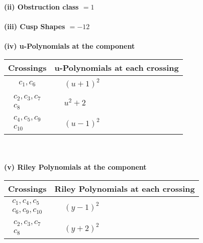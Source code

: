 \documentclass[1p]{elsarticle_modified}
\theoremstyle{definition}
\begin{document}
\flushleft \textbf{(ii) Obstruction class $= 1$}\\~\\
\flushleft \textbf{(iii) Cusp Shapes $= -12$}\\~\\
\newpage\renewcommand{\arraystretch}{1}
\flushleft \textbf{(iv) u-Polynomials at the component}\newline \\
\begin{tabular}{m{50pt}|m{274pt}}
Crossings & \hspace{64pt}u-Polynomials at each crossing \\
\hline $$\begin{aligned}c_{1},c_{6}\end{aligned}$$&$\begin{aligned}
&(u+1)^2
\end{aligned}$\\
\hline $$\begin{aligned}c_{2},c_{3},c_{7}\\c_{8}\end{aligned}$$&$\begin{aligned}
&u^2+2
\end{aligned}$\\
\hline $$\begin{aligned}c_{4},c_{5},c_{9}\\c_{10}\end{aligned}$$&$\begin{aligned}
&(u-1)^2
\end{aligned}$\\
\hline
\end{tabular}\\~\\
\newpage\renewcommand{\arraystretch}{1}
\flushleft \textbf{(v) Riley Polynomials at the component}\newline \\
\begin{tabular}{m{50pt}|m{274pt}}
Crossings & \hspace{64pt}Riley Polynomials at each crossing \\
\hline $$\begin{aligned}c_{1},c_{4},c_{5}\\c_{6},c_{9},c_{10}\end{aligned}$$&$\begin{aligned}
&(y-1)^2
\end{aligned}$\\
\hline $$\begin{aligned}c_{2},c_{3},c_{7}\\c_{8}\end{aligned}$$&$\begin{aligned}
&(y+2)^2
\end{aligned}$\\
\hline
\end{tabular}\\~\\
\end{document}
